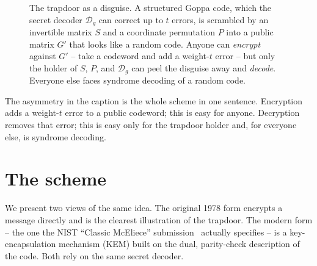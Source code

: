 \begin{figure}[H]
\centering
{}
\caption{The trapdoor as a disguise. A structured Goppa code, which the secret decoder $\mathcal{D}_g$ can correct up to $t$ errors, is scrambled by an invertible matrix $S$ and a coordinate permutation $P$ into a public matrix $G'$ that looks like a random code. Anyone can \emph{encrypt} against $G'$ -- take a codeword and add a weight-$t$ error -- but only the holder of $S$, $P$, and $\mathcal{D}_g$ can peel the disguise away and \emph{decode}. Everyone else faces syndrome decoding of a random code.}
\label{fig:mceliece-disguise}
\end{figure}

The asymmetry in the caption is the whole scheme in one sentence. Encryption adds a weight-$t$ error to a public codeword; this is easy for anyone. Decryption removes that error; this is easy only for the trapdoor holder and, for everyone else, is syndrome decoding.

\section{The scheme}

We present two views of the same idea. The original 1978 form encrypts a message directly and is the clearest illustration of the trapdoor. The modern form -- the one the NIST ``Classic McEliece'' submission~\cite{classicmceliece} actually specifies -- is a key-encapsulation mechanism (KEM) built on the dual, parity-check description of the code. Both rely on the same secret decoder.

